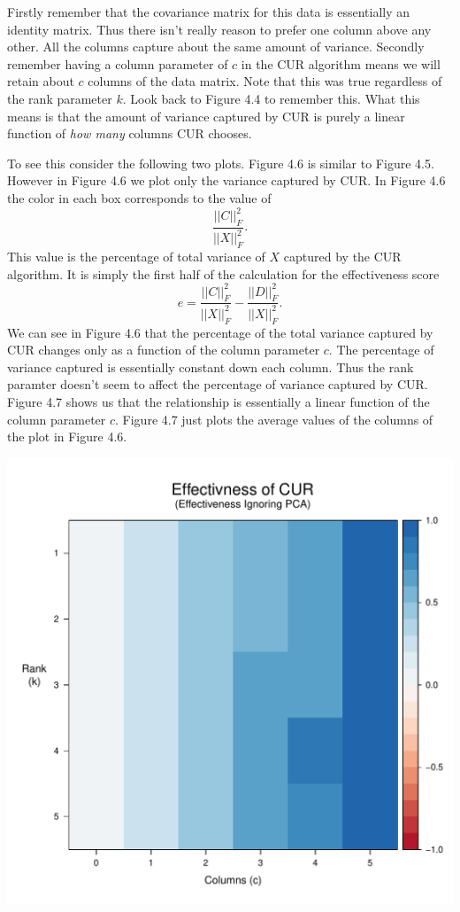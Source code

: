 \documentclass{book}
\begin{document}
Firstly remember that the covariance matrix for this data is essentially an identity matrix. Thus there isn't really reason to prefer one column above any other. All the columns capture about the same amount of variance. Secondly remember having a column parameter of $c$ in the CUR algorithm means we will retain about $c$ columns of the data matrix. Note that this was true regardless of the rank parameter $k$. Look back to Figure 4.4 to remember this. What this means is that the amount of variance captured by CUR is purely a linear function of \emph{how many} columns CUR chooses. 

To see this consider the following two plots. Figure 4.6 is similar to Figure 4.5. However in Figure 4.6 we plot only the variance captured by CUR. In Figure 4.6 the color in each box corresponds to the value of 
$$
\frac{||C||_F^2}{||X||_F^2}.
$$
This value is the percentage of total variance of $X$ captured by the CUR algorithm. It is simply the first half of the calculation for the effectiveness score
$$
e=\frac{||C||_F^2}{||X||_F^2}-\frac{||D||_F^2}{||X||_F^2}.
$$
We can see in Figure 4.6 that the percentage of the total variance captured by CUR changes only as a function of the column parameter $c$. The percentage of variance captured is essentially constant down each column. Thus the rank paramter doesn't seem to affect the percentage of variance captured by CUR. Figure 4.7 shows us that the relationship is essentially a linear function of the column parameter $c$. Figure 4.7 just plots the average values of the columns of the plot in Figure 4.6. 

\begin{center}
\includegraphics[scale=.63]{./Figures/diag_ex_1_cur_raster.pdf}%
\end{center}
\end{document}
